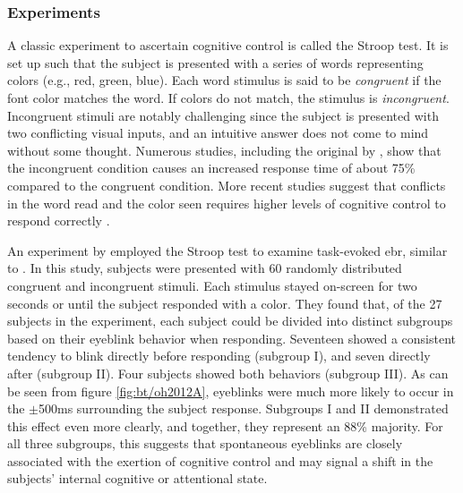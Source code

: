 
\subsubsection{Experiments}

A classic experiment to ascertain cognitive control is called the Stroop test. It is set up such that the subject is presented with a series of words representing colors (e.g., red, green, blue). Each word stimulus is said to be \textit{congruent} if the font color matches the word. If colors do not match, the stimulus is \textit{incongruent}. Incongruent stimuli are notably challenging since the subject is presented with two conflicting visual inputs, and an intuitive answer does not come to mind without some thought. Numerous studies, including the original by \textcite{stroop1935}, show that the incongruent condition causes an increased response time of about 75\% compared to the congruent condition. More recent studies suggest that conflicts in the word read and the color seen requires higher levels of cognitive control to respond correctly \cite{egner2005, bugg2012}. 

An experiment by \textcite{oh2012} employed the Stroop test to examine task-evoked \acrshort{ebr}, similar to \textcite{bochove2012}. In this study, subjects were presented with 60 randomly distributed congruent and incongruent stimuli. Each stimulus stayed on-screen for two seconds or until the subject responded with a color. They found that, of the 27 subjects in the experiment, each subject could be divided into distinct subgroups based on their eyeblink behavior when responding. Seventeen showed a consistent tendency to blink directly before responding (subgroup I), and seven directly after (subgroup II). Four subjects showed both behaviors (subgroup III). As can be seen from figure \ref{fig:bt/oh2012A}, eyeblinks were much more likely to occur in the $\pm$500ms surrounding the subject response. 
Subgroups I and II demonstrated this effect even more clearly, and together, they represent an 88\% majority. For all three subgroups, this suggests that spontaneous eyeblinks are closely associated with the exertion of cognitive control and may signal a shift in the subjects' internal cognitive or attentional state.

